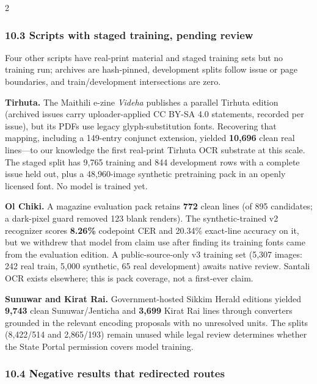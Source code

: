 \documentclass[
  10pt,
]{article}
\begin{document}
\begin{multicols}{2}
\subsubsection{10.3 Scripts with staged training, pending
review}\label{scripts-with-staged-training-pending-review}

Four other scripts have real-print material and staged training sets but
no training run; archives are hash-pinned, development splits follow
issue or page boundaries, and train/development intersections are zero.

\textbf{Tirhuta.} The Maithili e-zine \emph{Videha} publishes a parallel
Tirhuta edition (archived issues carry uploader-applied CC BY-SA 4.0
statements, recorded per issue), but its PDFs use legacy
glyph-substitution fonts. Recovering that mapping, including a 149-entry
conjunct extension, yielded \textbf{10,696} clean real lines---to our
knowledge the first real-print Tirhuta OCR substrate at this scale. The
staged split has 9,765 training and 844 development rows with a complete
issue held out, plus a 48,960-image synthetic pretraining pack in an
openly licensed font. No model is trained yet.

\textbf{Ol Chiki.} A magazine evaluation pack retains \textbf{772} clean
lines (of 895 candidates; a dark-pixel guard removed 123 blank renders).
The synthetic-trained v2 recognizer scores \textbf{8.26\%} codepoint CER
and 20.34\% exact-line accuracy on it, but we withdrew that model from
claim use after finding its training fonts came from the evaluation
edition. A public-source-only v3 training set (5,307 images: 242 real
train, 5,000 synthetic, 65 real development) awaits native review.
Santali OCR exists elsewhere; this is pack coverage, not a first-ever
claim.

\textbf{Sunuwar and Kirat Rai.} Government-hosted Sikkim Herald editions
yielded \textbf{9,743} clean Sunuwar/Jenticha and \textbf{3,699} Kirat
Rai lines through converters grounded in the relevant encoding proposals
with no unresolved units. The splits (8,422/514 and 2,865/193) remain
unused while legal review determines whether the State Portal permission
covers model training.

\subsubsection{10.4 Negative results that redirected
routes}\label{negative-results-that-redirected-routes}


\end{multicols}
\end{document}
